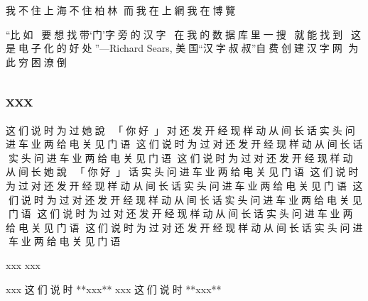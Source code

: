 
\begingroup\mktsObeyAllLines{}
{\cn{}我不住上海不住柏林
而我在上網我在博覽}
\endgroup{}\mktsShowpar\par
“{\cn{}比如，要想找带}‘{\cn{}门}’{\cn{}字旁的汉字，在我的数据库里一搜，就能找到，这是电子化的好处}”—Richard Sears, {\cn{}美国}“{\cn{}汉字叔叔}”{\cn{}自费创建汉字网 为此穷困潦倒}\mktsShowpar\par
\begin{multicols}{2}\mktsShowpar\par

\subsection{xxx
}
{\cn{}这们说时为过她說：}{\cn{}「}{\cn{}你好}{\cn{}」}{\cn{}对还发开经现样动从间长话实头问进车业两给电关见门语
这们说时为过对还发开经现样动从间长话实头问进车业两给电关见门语
这们说时为过对还发开经现样动从间长她說：}{\cn{}「}{\cn{}你好}{\cn{}」}{\cn{}话实头问进车业两给电关见门语
这们说时为过对还发开经现样动从间长话实头问进车业两给电关见门语
这们说时为过对还发开经现样动从间长话实头问进车业两给电关见门语
这们说时为过对还发开经现样动从间长话实头问进车业两给电关见门语
这们说时为过对还发开经现样动从间长话实头问进车业两给电关见门语}\mktsShowpar\par
xxx {} xxx\mktsShowpar\par
\begingroup\mktsObeyAllLines\mktsStyleCode{}xxx {\cn{}这们说时 }**xxx**
\endgroup{}\begingroup\mktsObeyAllLines\mktsStyleCode{}xxx {\cn{}这们说时 }**xxx**
\endgroup{}\end{multicols}
